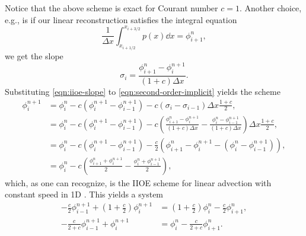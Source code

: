 \documentclass[../thesis.tex]{subfiles}
\begin{document}
Notice that the above scheme is exact for Courant number \(c = 1\).
Another choice, e.g., is if our linear reconstruction satisfies the integral equation
\begin{equation}
    \frac{1}{\Delta x}
    \int_{x_{i+1/2}}^{x_{i+3/2}}
    p(x)\dd{x}
    = \phi_{i+1}^{n},
\end{equation}
we get the slope
\begin{equation}
    \label{eqn:iioe-slope}
    \sigma_{i} = \frac{\phi_{i+1}^{n} - \phi_{i}^{n+1}}{(1+c)\Delta x}.
\end{equation}
Substituting \eqref{eqn:iioe-slope} to \eqref{eqn:second-order-implicit} yields the scheme
\begin{equation}\label{eqn:iioe-1d}
    \begin{split}
        \phi_{i}^{n+1}
        &= \phi_{i}^{n} - c\left(
            \phi_{i}^{n+1}
            - \phi_{i-1}^{n+1}
            \right)
            -c\left(
            \sigma_{i} - \sigma_{i-1}
            \right)\Delta x\frac{1+c}{2},
        \\
        &= \phi_{i}^{n} - c\left(
            \phi_{i}^{n+1}
            - \phi_{i-1}^{n+1}
            \right)
            -c\left(
                \frac{\phi_{i+1}^{n} - \phi_{i}^{n+1}}{(1+c)\Delta x}
                - \frac{\phi_{i}^{n} - \phi_{i-1}^{n+1}}{(1+c)\Delta x}
            \right)\Delta x\frac{1+c}{2},
        \\
        &= \phi_{i}^{n} - c\left(
            \phi_{i}^{n+1}
            - \phi_{i-1}^{n+1}
            \right)
            -\frac{c}{2}\left(
                \phi_{i+1}^{n} - \phi_{i}^{n+1}
                - (\phi_{i}^{n} - \phi_{i-1}^{n+1})
            \right),
        \\
        &= \phi_{i}^{n}
            -c\left(
                \frac{\phi_{i+1}^{n} + \phi_{i}^{n+1}}{2}
                - \frac{\phi_{i}^{n} + \phi_{i-1}^{n+1}}{2}
            \right),
    \end{split}
\end{equation}
which, as one can recognize, is the IIOE scheme for linear advection with constant speed in 1D \cite{2014_Mikula,2018_Frolkovic,2020_Ibolya_CONF}.
This yields a system
\begin{equation}
    \label{eqn:iioe-system}
    \begin{split}
        -\frac{c}{2}\phi_{i-1}^{n+1}
        +\left( 1 + \frac{c}{2} \right)
        \phi_{i}^{n+1}
        &=
        \left( 1 + \frac{c}{2} \right)
        \phi_{i}^{n}
        -\frac{c}{2}\phi_{i+1}^{n},
        \\
        -\frac{c}{2+c}\phi_{i-1}^{n+1}
        +\phi_{i}^{n+1}
        &=
        \phi_{i}^{n}
        -\frac{c}{2+c}\phi_{i+1}^{n}.
    \end{split}
\end{equation}
\end{document}
